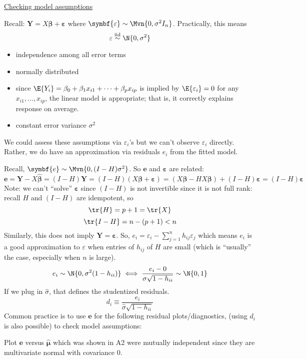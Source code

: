 \underline{Checking model assumptions}

Recall: $ \symbf{Y}=X \symbf{\beta}+\symbf{\varepsilon} $
where $ \symbf{\varepsilon}\sim \Mvn{0,\sigma^2I_{n}} $.
Practically, this means
\[ \varepsilon \stackrel{\text{iid}}{\sim}\N{0,\sigma^2} \]
\begin{itemize}
    \item independence among all error terms
    \item normally distributed
    \item since $ \E{Y_i}=\beta_0+\beta_1x_{i1}+\cdots+\beta_p x_{ip} $
          is implied by $ \E{\varepsilon_i}=0 $ for any
          $ x_{i1},\ldots,x_{ip} $, the linear model
          is appropriate; that is, it correctly explains response
          on average.
    \item constant error variance $ \sigma^2 $
\end{itemize}
We could assess these assumptions
via $ \varepsilon_i $'s but we can't observe
$ \varepsilon_i $ directly. Rather, we do have an approximation
via residuals $ e_i $ from the fitted model.

Recall, $ \symbf{e}\sim \Mvn{0,(I-H)\sigma^2} $.
So $ \symbf{e} $ and $ \symbf{\varepsilon} $ are related:
\[ \symbf{e}=\symbf{Y}-X \hat{\symbf{\beta}}=(I-H)\symbf{Y}=
    (I-H)(X \symbf{\beta}+\symbf{\varepsilon})=
    (X \symbf{\beta}-H X\symbf{\beta})+(I-H)\symbf{\varepsilon}=
    (I-H)\symbf{\varepsilon} \]
Note: we can't ``solve'' $ \symbf{\varepsilon} $
since $ (I-H) $ is not invertible since it is not full rank:
recall $ H $ and $ (I-H) $ are idempotent, so
\[ \tr{H}=p+1=\tr{X} \]
\[ \tr{I-H}=n-(p+1)<n \]
Similarly, this does not imply $ \symbf{Y}=\symbf{\varepsilon} $.
So, $ e_i=\varepsilon_i-\sum_{j=1}^{n} h_{ij}\varepsilon_j $
which means $ e_i $ is a good approximation to $ \varepsilon $
when entries of $ h_{ij} $ of $ H $ are small
(which is ``usually'' the case, especially when $ n $ is large).
\[ e_i \sim \N{0,\sigma^2(1-h_{ii})}\iff
    \frac{e_i-0}{\sigma\sqrt{1-h_{ii}}} \sim \N{0,1} \]
If we plug in $ \hat{\sigma} $, that defines
the studentized residuals.
\[ d_i\equiv \frac{e_i}{\hat{\sigma}\sqrt{1-h_{ii}}}  \]
Common practice is to use $ \symbf{e} $ for
the following residual plots/diagnostics,
(using $ d_i $ is also possible) to check model assumptions:

Plot $ \symbf{e} $ versus $ \hat{\symbf{\mu}} $ which
was shown in A2 were mutually independent
since they are multivariate normal with covariance 0.

